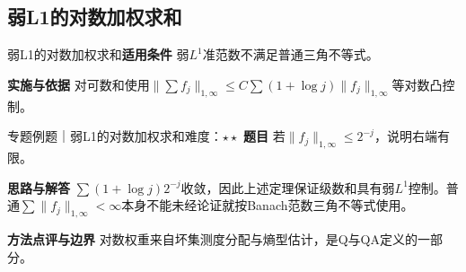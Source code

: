 \subsection{弱L1的对数加权求和}\label{mat:endpoint_spaces:weakseries}
\begin{method}{弱L1的对数加权求和}\textbf{适用条件} 弱$L^1$准范数不满足普通三角不等式。\par\textbf{实施与依据} 对可数和使用$\|\sum f_j\|_{1,\infty}\le C\sum(1+\log j)\|f_j\|_{1,\infty}$等对数凸控制。\end{method}
\begin{example}{专题例题｜弱L1的对数加权求和}{难度：$\star\star$}
\textbf{题目} 若$\|f_j\|_{1,\infty}\le2^{-j}$，说明右端有限。\par\textbf{思路与解答} $\sum(1+\log j)2^{-j}$收敛，因此上述定理保证级数和具有弱$L^1$控制。普通$\sum\|f_j\|_{1,\infty}<\infty$本身不能未经论证就按Banach范数三角不等式使用。\par\textbf{方法点评与边界} 对数权重来自坏集测度分配与熵型估计，是Q与QA定义的一部分。
\end{example}
